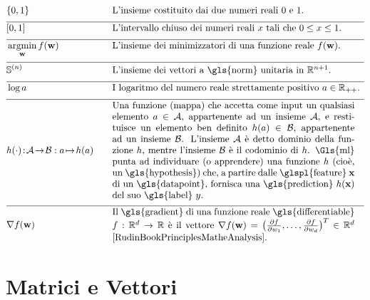 \newpage
\begin{align}
		&\{0,1\}& \quad & \mbox{L'insieme costituito dai due numeri reali $0$ e $1$.} \nonumber \\[2mm] \hline \nonumber\\[-5mm]
	&[0,1] &\quad &\mbox{L'intervallo chiuso dei numeri reali $x$ tali che $0 \leq x \leq 1$. }\nonumber \\[2mm] \hline \nonumber\\[-5mm]
    &\argmin_{\weights} f(\weights) &\quad &\mbox{L'insieme dei minimizzatori di una funzione reale $f(\weights)$.  } \nonumber \\[2mm] \hline \nonumber\\[-5mm]
    &\sphere{\nrnodes} &\quad &\mbox{L'insieme dei vettori a \gls{norm} unitaria in $\mathbb{R}^{\nrnodes+1}$.  }\nonumber \\[2mm] \hline \nonumber\\[-5mm]
	 &\log a &\quad &\mbox{I logaritmo del numero reale strettamente positivo $a \in \mathbb{R}_{++}$.  } \nonumber \\[2mm] \hline \nonumber\\[-5mm]
	 &\hypothesis(\cdot)\!:\!\mathcal{A}\!\rightarrow\!\mathcal{B} :  a \!\mapsto\!h(a) &\quad &\parbox{.75\textwidth}{
	 	Una funzione (mappa) che accetta come input un qualsiasi elemento $a \in \mathcal{A}$, appartenente ad un insieme $\mathcal{A}$, e restituisce un elemento ben definito $h(a) \in \mathcal{B}$, appartenente ad un insieme $\mathcal{B}$. 
	 	L'insieme $\mathcal{A}$ è detto dominio della funzione $h$, mentre l'insieme $\mathcal{B}$ è il codominio di $\hypothesis$. \Gls{ml} punta ad individuare (o apprendere) una funzione $\hypothesis$ (cioè, un \gls{hypothesis}) che, a partire dalle \glspl{feature} $\featurevec$ di un \gls{datapoint}, fornisca una \gls{prediction} $\hypothesis(\featurevec)$
	 	del suo \gls{label} $\truelabel$.} \nonumber \\[2mm] \hline \nonumber\\[-5mm]
	 	&\nabla f(\weights) & \quad & \parbox{.75\textwidth}{Il \gls{gradient} di una funzione reale \gls{differentiable}
	 	$f: \mathbb{R}^{\featuredim}\rightarrow \mathbb{R}$ è il vettore
	 	$\nabla f(\weights) = \big( \frac{\partial f}{\partial \weight_{1}},\ldots,\frac{\partial f}{\partial \weight_{\featuredim}}  \big)^{T} \in \mathbb{R}^{\featuredim}$ \cite[Ch. 9]{RudinBookPrinciplesMatheAnalysis}.}   \nonumber
\end{align} 
\section*{Matrici e Vettori} 

